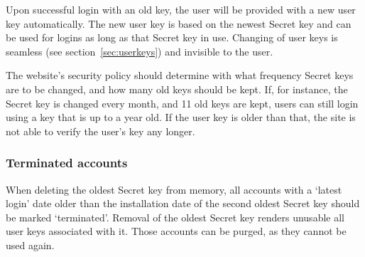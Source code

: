 \par
Upon successful login with an old key,
the user will be provided with a new user key automatically.
The new user key is based on the newest Secret key and can be used for logins as long as that Secret key in use.
Changing of user keys is seamless
(see section~\vref{sec:userkeys})
and invisible to the user.
\par
The website's security policy should determine with what frequency Secret keys are to be changed,
and how many old keys should be kept.
If,
for instance,
the Secret key is changed every month,
and 11 old keys are kept,
users can still login using a key that is up to a year old.
If the user key is older than that,
the site is not able to verify the user's key any longer.

\subsubsection{Terminated accounts}
When deleting the oldest Secret key from memory,
all accounts with a `latest login' date older than the installation
date of the second oldest Secret key should be marked `terminated'.
Removal of the oldest Secret key renders unusable all user keys associated with it.
Those accounts can be purged, as they cannot be used again.

